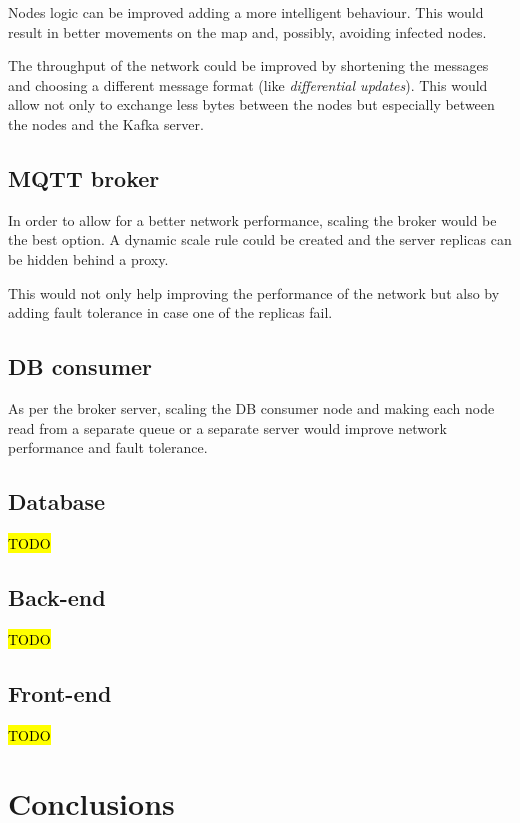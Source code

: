 \documentclass[conference]{IEEEtran}
\begin{document}
		Nodes logic can be improved adding a more intelligent behaviour.
		This would result in better movements on the map and, possibly, avoiding infected nodes.
		
		The throughput of the network could be improved by shortening the messages and choosing a different message format (like \textit{differential updates}).
		This would allow not only to exchange less bytes between the nodes but especially between the nodes and the Kafka server.
	
	\subsection{MQTT broker}
		
		In order to allow for a better network performance, scaling the broker would be the best option.
		A dynamic scale rule could be created and the server replicas can be hidden behind a proxy.
		
		This would not only help improving the performance of the network but also by adding fault tolerance in case one of the replicas fail.
		
	\subsection{DB consumer}
		
		As per the broker server, scaling the DB consumer node and making each node read from a separate queue or a separate server would improve network performance and fault tolerance.
	
	\subsection{Database}
	
		\hl{TODO}
	
	\subsection{Back-end}
		
		\hl{TODO}
	
	\subsection{Front-end}
	
		\hl{TODO}
	
\section{Conclusions}\label{sec:conclusions}
\end{document}
